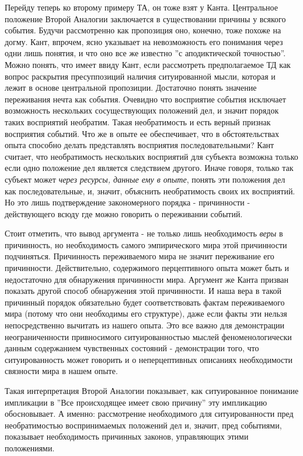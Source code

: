 \documentclass{article}
\begin{document}
Перейду теперь ко второму примеру ТА, он тоже взят у Канта. Центральное положение Второй Аналогии заключается в существовании причины у всякого события. Будучи рассмотренно как пропозиция оно, конечно, тоже похоже на догму. Кант, впрочем, ясно указывает на невозможность его понимания через одни лишь понятия, и что оно все же известно ''с аподиктической точностью''. Можно понять, что имеет ввиду Кант, если рассмотреть предполагаемое ТД как вопрос раскрытия пресуппозиций наличия ситуированной мысли, которая и лежит в основе центральной пропозиции. Достаточно понять значение переживания нечта как события. Очевидно что восприятие события исключает возможность нескольких сосуществующих положений дел, и значит порядок таких восприятий необратим. Такая необратимость и есть верный признак восприятия событий. Что же в опыте ее обеспечивает, что в обстоятельствах опыта способно делать представлять восприятия последовательными? Кант считает, что необратимость нескольких восприятий для субъекта возможна только если одно положение дел является следствием другого. Иначе говоря, только так субъект может \textit{через ресурсы, данные ему в опыте}, понять эти положения дел как последовательные, и, значит, объяснить необратимость своих их восприятий. Но это лишь подтверждение закономерного порядка - причинности - действующего всюду где можно говорить о переживании событий.

Стоит отметить, что вывод аргумента - не только лишь необходимость \textit{веры} в причинность, но необходимость самого эмпирического мира этой причинности подчиняться. Причинность переживаемого мира не значит переживание его причинности. Действительно, содержимого перцептивного опыта может быть и недостаточно для обнаружения причинности мира. Аргумент же Канта призван показать другой способ обнаружения этой причинности. И наша вера в такой причинный порядок обязательно будет соответствовать фактам переживаемого мира (потому что они необходимы его структуре), даже если факты эти нельзя непосредственно вычитать из нашего опыта. Это все важно для демонстрации неограниченности привносимого ситуированностью мыслей феноменологически данным содержанием чувственных состояний - демонстрации того, что ситуированность может говорить и о неперцептивных описаниях необходимости связности мира в нашем опыте.

Такая интерпретация Второй Аналогии показывает, как ситуированное понимание импликации в ''Все происходящее имеет свою причину'' эту импликацию обосновывает. А именно: рассмотрение необходимого для ситуированности пред необратимостью воспринимаемых положений дел и, значит, пред событиями, показывает необходимость причинных законов, управляющих этими положениями.
\end{document}
